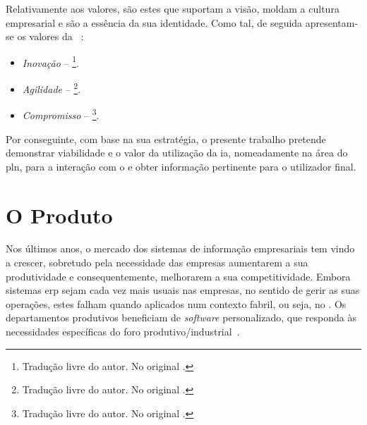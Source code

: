 Relativamente aos valores, são estes que suportam a visão, moldam a cultura empresarial e são a essência da sua identidade. Como tal, de seguida apresentam-se os valores da {\companyname}~\parencite{cmf_strategy}:

\begin{itemize}
    \item 
    {
        \textit{Inovação} -- \footnote{Tradução livre do autor. No original .}.
    }
    \item
    {
        \textit{Agilidade} -- \footnote{Tradução livre do autor. No original .}.
    }
    \item
    {
        \textit{Compromisso} -- \footnote{Tradução livre do autor. No original .}.
    }
\end{itemize}

Por conseguinte, com base na sua estratégia, o presente trabalho pretende demonstrar viabilidade e o valor da utilização da \gls{ia}, nomeadamente na área do \gls{pln}, para a interação com o {\productname} e obter informação pertinente para o utilizador final. 

\section{O Produto}
\label{sec:chap02_product}
Nos últimos anos, o mercado dos sistemas de informação empresariais tem vindo a crescer, sobretudo pela necessidade das empresas aumentarem a sua produtividade e consequentemente, melhorarem a sua competitividade. Embora sistemas \gls{erp} sejam cada vez mais usuais nas empresas, no sentido de gerir as suas operações, estes falham quando aplicados num contexto fabril, ou seja, no . Os departamentos produtivos beneficiam de \textit{software} personalizado, que responda às necessidades específicas do foro produtivo/industrial~\parencite{mes_literature_review}.

